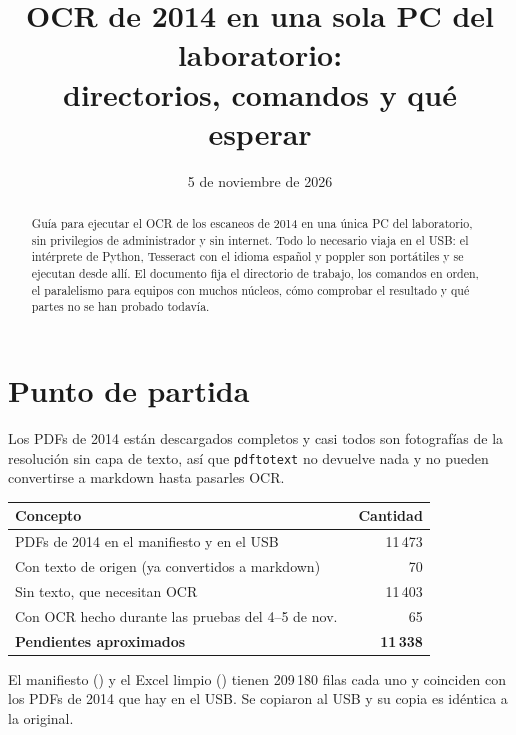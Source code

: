 ﻿\documentclass[11pt,a4paper]{article}
\title{OCR de 2014 en una sola PC del laboratorio:\\ directorios, comandos y qué esperar}
\author{}
\date{5 de noviembre de 2026}
\begin{document}
\maketitle

\begin{abstract}
Guía para ejecutar el OCR de los escaneos de 2014 en una única PC del laboratorio, sin
privilegios de administrador y sin internet. Todo lo necesario viaja en el USB: el
intérprete de Python, Tesseract con el idioma español y poppler son portátiles y se
ejecutan desde allí. El documento fija el directorio de trabajo, los comandos en orden, el
paralelismo para equipos con muchos núcleos, cómo comprobar el resultado y qué partes no
se han probado todavía.
\end{abstract}

\tableofcontents

\section{Punto de partida}

Los PDFs de 2014 están descargados completos y casi todos son fotografías de la
resolución sin capa de texto, así que \texttt{pdftotext} no devuelve nada y no pueden
convertirse a markdown hasta pasarles OCR.

\begin{center}
\begin{tabular}{lr}
\toprule
Concepto & Cantidad \\
\midrule
PDFs de 2014 en el manifiesto y en el USB & 11\,473 \\
Con texto de origen (ya convertidos a markdown) & 70 \\
Sin texto, que necesitan OCR & 11\,403 \\
Con OCR hecho durante las pruebas del 4--5 de nov.\ & 65 \\
\textbf{Pendientes aproximados} & \textbf{11\,338} \\
\bottomrule
\end{tabular}
\end{center}

El manifiesto () y el Excel limpio
() tienen 209\,180 filas cada uno y
coinciden con los PDFs de 2014 que hay en el USB. Se copiaron al USB y su copia es
idéntica a la original.

\end{document}
